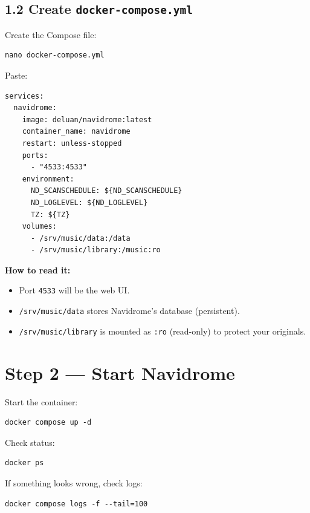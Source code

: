\subsection{1.2 Create \texttt{docker-compose.yml}}
Create the Compose file:

\begin{lstlisting}
nano docker-compose.yml
\end{lstlisting}

Paste:

\begin{lstlisting}
services:
  navidrome:
    image: deluan/navidrome:latest
    container_name: navidrome
    restart: unless-stopped
    ports:
      - "4533:4533"
    environment:
      ND_SCANSCHEDULE: ${ND_SCANSCHEDULE}
      ND_LOGLEVEL: ${ND_LOGLEVEL}
      TZ: ${TZ}
    volumes:
      - /srv/music/data:/data
      - /srv/music/library:/music:ro
\end{lstlisting}

\textbf{How to read it:}
\begin{itemize}[leftmargin=*]
  \item Port \texttt{4533} will be the web UI.
  \item \texttt{/srv/music/data} stores Navidrome's database (persistent).
  \item \texttt{/srv/music/library} is mounted as \texttt{:ro} (read-only) to protect your originals.
\end{itemize}


\section{Step 2 --- Start Navidrome}
Start the container:

\begin{lstlisting}
docker compose up -d
\end{lstlisting}

Check status:

\begin{lstlisting}
docker ps
\end{lstlisting}

If something looks wrong, check logs:

\begin{lstlisting}
docker compose logs -f --tail=100
\end{lstlisting}

